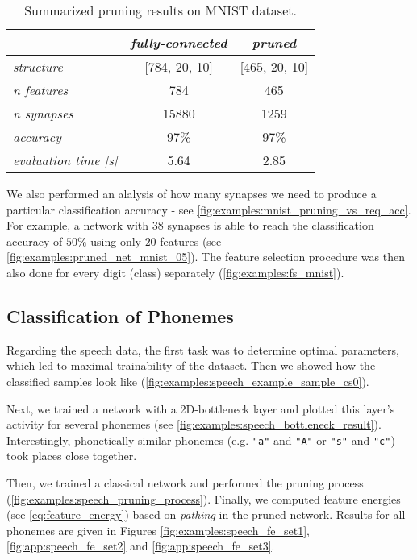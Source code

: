 \begin{table}[H]
\centering
\begin{tabular}{|l|c|c|}
\hline
                                 & \textit{fully-connected} & \textit{pruned}   \\ \hline
\textit{structure}               & {[}784, 20, 10{]}        & {[}465, 20, 10{]} \\ \hline
\textit{n features}              & 784                      & 465               \\ \hline
\textit{n synapses}              & 15880                    & 1259              \\ \hline
\textit{accuracy}                & 97\%                     & 97\%              \\ \hline
\textit{evaluation time {[}s{]}} & 5.64                     & 2.85              \\ \hline
\end{tabular}
\caption{Summarized pruning results on MNIST dataset.}
\label{tab:discussion:pruning_results_mnist}
\end{table}

We also performed an alalysis of how many synapses we need to produce a particular classification accuracy - see \cref{fig:examples:mnist_pruning_vs_req_acc}. For example, a network with $ 38 $ synapses is able to reach the classification accuracy of $ 50\% $ using only $ 20 $ features (see \cref{fig:examples:pruned_net_mnist_05}). The feature selection procedure was then also done for every digit (class) separately (\cref{fig:examples:fs_mnist}).

\subsection*{Classification of Phonemes}
Regarding the speech data, the first task was to determine optimal parameters, which led to maximal trainability of the dataset. Then we showed how the classified samples look like (\cref{fig:examples:speech_example_sample_cs0}).

Next, we trained a network with a 2D-bottleneck layer and plotted this layer's activity for several phonemes (see \cref{fig:examples:speech_bottleneck_result}). Interestingly, phonetically similar phonemes (e.g. \texttt{"a"} and \texttt{"A"} or \texttt{"s"} and \texttt{"c"}) took places close together. 

Then, we trained a classical network and performed the pruning process (\cref{fig:examples:speech_pruning_process}). Finally, we computed feature energies (see \cref{eq:feature_energy}) based on \textit{pathing} in the pruned network. Results for all phonemes are given in Figures \ref{fig:examples:speech_fe_set1}, \ref{fig:app:speech_fe_set2} and \ref{fig:app:speech_fe_set3}.

